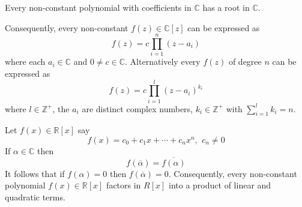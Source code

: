 
\begin{thm}
Every non-constant polynomial with coefficients in $\mathbb{C}$ has a root in $\mathbb{C}$.

Consequently, every non-constant $f(z) \in \mathbb{C}[z]$ can be expressed as \[f(z) = c \prod_{i=1}^n (z - a_i)\] where each $a_i \in \mathbb{C}$ and $0\neq c \in \mathbb{C}$. Alternatively every $f(z)$ of degree $n$ can be expressed as \[f(z) = c\prod_{i=1}^l (z-a_i)^{k_i}\] where $l\in\mathbb{Z}^+$, the $a_i$ are distinct complex numbers, $k_i \in\mathbb{Z}^+$ with $\sum_{i=1}^l k_i =n$.
\end{thm}

\begin{note}
Let $f(x) \in \mathbb{R}[x]$ say \[f(x) = c_0 + c_1 x + \cdots + c_nx^n, \,\ c_n \neq 0\]
If $\alpha \in \mathbb{C}$ then \[f(\overline{\alpha}) =\overline{f(\alpha)}\] It follows that if $f(\alpha) = 0$ then $f(\overline{\alpha}) = 0$. Consequently, every non-constant polynomial $f(x) \in \mathbb{R}[x]$ factors in $R[x]$ into a product of linear and quadratic terms.
\end{note}